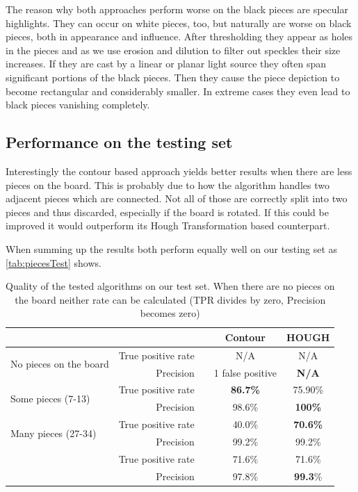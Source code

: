 	The reason why both approaches perform worse on the black pieces are specular highlights. They can occur on white pieces, too, but naturally are worse on black pieces, both in appearance and influence. After thresholding they appear as holes in the pieces and as we use erosion and dilution to filter out speckles their size increases. If they are cast by a linear or planar light source they often span significant portions of the black pieces. Then they cause the piece depiction to become rectangular and considerably smaller. In extreme cases they even lead to black pieces vanishing completely.

	\subsection{Performance on the testing set}
	\label{evaluation-occluded-performance}
	
	Interestingly the contour based approach yields better results when there are less pieces on the board. This is probably due to how the algorithm handles two adjacent pieces which are connected. Not all of those are correctly split into two pieces and thus discarded, especially if the board is rotated. If this could be improved it would outperform its Hough Transformation based counterpart.

	When summing up the results both perform equally well on our testing set as \autoref{tab:piecesTest} shows.
	\begin{table}[b!]
		\begin{tabular}{lr ccc}
		    \multicolumn{2}{c}{}											 		&\hphantom{Abst} & Contour 	& HOUGH\\
			\toprule
			\multirow{2}{*}{No pieces on the board}   		& True positive rate 	&& N/A 		& N/A  \\
															& Precision			 	&& 1 false positive 		& \bf{N/A} \\
			\midrule
			\multirow{2}{*}{Some pieces (7-13)}				& True positive rate 	&& \bf{86.7\%} 	& 75.90\% \\
															& Precision 			&& 98.6\% 		& \bf{100\%} \\
			\midrule
			\multirow{2}{*}{Many pieces (27-34)} 			& True positive rate 	&& 40.0\% 		& \bf{70.6\%} \\
															& Precision			 	&& 99.2\% 		& 99.2\% \\
			\specialrule{\heavyrulewidth}{\aboverulesep}{10pt}

			\multirow{2}{*}{Total}				 			& True positive rate 	&& 71.6\% 		& 71.6\% \\
															& Precision			 	&& 97.8\% 		& \textbf{99.3}\% \\
			\bottomrule
		\end{tabular}
		\caption{Quality of the tested algorithms on our test set. When there are no pieces on the board neither rate can be calculated (TPR divides by zero, Precision becomes zero)}
		\label{tab:piecesTest}
	\end{table}


